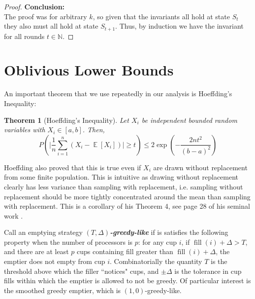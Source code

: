 \documentclass[twocolumn]{article}[11pt]
\newcommand{\defn}[1]{{\textit{\textbf{\boldmath #1}}}}
\DeclareMathOperator{\E}{\mathbb{E}}
\DeclareMathOperator{\fil}{\text{fill}}
\newtheorem{theorem}{Theorem}
\begin{document}
\begin{proof}




\textbf{Conclusion:}\\
The proof was for arbitrary $k$, so given that the invariants all hold at state
$S_t$ they also must all hold at state $S_{t+1}$.
Thus, by induction we have the invariant for all rounds $t\in\mathbb{N}$.
\end{proof}


\section{Oblivious Lower Bounds}\label{sec:oblivious}

An important theorem that we use repeatedly in our analysis is Hoeffding's Inequality:
\begin{theorem}[Hoeffding's Inequality]
  Let $X_i$ be independent bounded random variables with $X_i \in [a,b]$. Then,
  $$P\left(\Big|\frac{1}{n} \sum_{i=1}^n (X_i - \E[X_i])\Big|\ge t\right) \le
  2\exp\left(-\frac{2nt^2}{(b-a)^2}\right) $$
\end{theorem}
Hoeffding also proved that this is true even if $X_i$ are drawn without
replacement from some finite population. This is intuitive as drawing without
replacement clearly has less variance than sampling with replacement, i.e.
sampling without replacement should be more tightly concentrated around the
mean than sampling with replacement. This is a corollary of his Theorem 4, see
page 28 of his seminal work \cite{who62}.

Call an emptying strategy $(T, \Delta)$\defn{-greedy-like} if is satisfies
the following property when the number of processors is $p$: for any cup
$i$, if $\fil(i) + \Delta > T$, and there are at least $p$ cups containing fill
greater than $\fil(i) + \Delta$, the emptier does not empty from cup $i$. 
Combinatorially the quantity $T$ is the threshold above which the filler
``notices" cups, and $\pm\Delta$ is the tolerance in cup fills within which the
emptier is allowed to not be greedy.
Of particular interest is the smoothed greedy emptier, which is $(1, 0)$-greedy-like.
\end{document}

